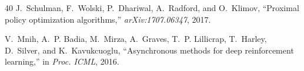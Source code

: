 \documentclass[journal,twocolumn,letterpaper]{IEEEtran}
\begin{document}
\begin{thebibliography}{40}
J.~Schulman, F.~Wolski, P.~Dhariwal, A.~Radford, and O.~Klimov,
  ``Proximal policy optimization algorithms,'' \emph{arXiv:1707.06347}, 2017.

V.~Mnih, A.~P. Badia, M.~Mirza, A.~Graves, T.~P. Lillicrap, T.~Harley,
  D.~Silver, and K.~Kavukcuoglu, ``Asynchronous methods for deep reinforcement
  learning,'' in \emph{Proc. ICML}, 2016.

\end{thebibliography}
\end{document}
